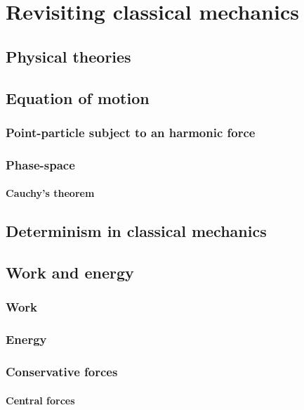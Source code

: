 \chapter{Revisiting classical mechanics}

\section{Physical theories}

\section{Equation of motion}

  \subsection{Point-particle subject to an harmonic force}

  \subsection{Phase-space}

    \subsubsection{Cauchy's theorem}

\section{Determinism in classical mechanics}

\section{Work and energy}

  \subsection{Work}

  \subsection{Energy}

  \subsection{Conservative forces}

    \subsubsection{Central forces}

